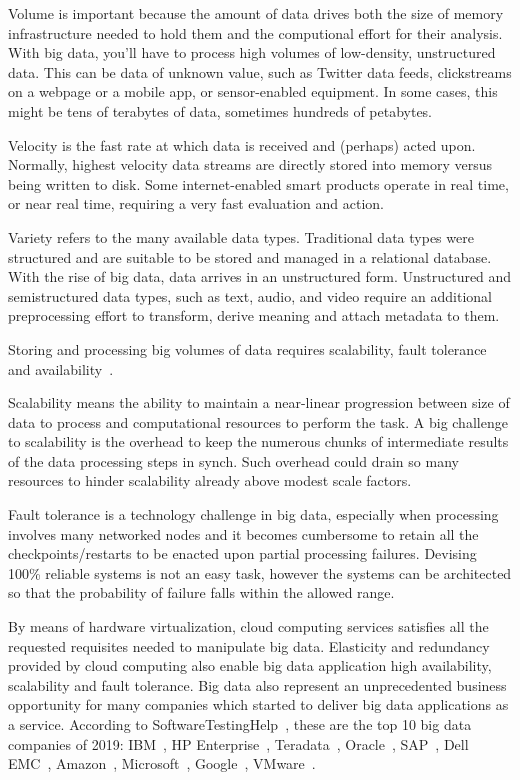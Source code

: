 Volume is important because the amount of data drives both the size of memory infrastructure needed to hold them and the computional effort for their analysis. With big data, you’ll have to process high volumes of low-density, unstructured data. This can be data of unknown value, such as Twitter data feeds, clickstreams on a webpage or a mobile app, or sensor-enabled equipment. In some cases, this might be tens of terabytes of data, sometimes hundreds of petabytes. 

Velocity is the fast rate at which data is received and (perhaps) acted upon. Normally, highest velocity data streams are directly stored into memory versus being written to disk. Some internet-enabled smart products operate in real time, or near real time, requiring a very fast evaluation and action. 

Variety refers to the many available data types. Traditional data types were structured and are suitable to be stored and managed in a relational database. With the rise of big data, data arrives in an unstructured form. Unstructured and semistructured data types, such as text, audio, and video require an additional preprocessing effort to transform, derive meaning and attach metadata to them. 

Storing and processing big volumes of data requires scalability, fault tolerance and availability~\cite{articleBigData:2017}. 

Scalability means the ability to maintain a near-linear progression between size of data to process and computational resources to perform the task. A big challenge to scalability is the overhead to keep the numerous chunks of intermediate results of the data processing steps in synch. Such overhead could drain so many resources to hinder scalability already above modest scale factors.

Fault tolerance is a technology challenge in big data, especially when processing involves many networked nodes and it becomes cumbersome to retain all the checkpoints/restarts to be  enacted upon partial processing failures. Devising 100\% reliable systems is not an easy task, however the systems can be architected so that the probability of failure falls within the allowed range. 

By means of hardware virtualization, cloud computing services satisfies all the requested requisites needed to manipulate big data. Elasticity and redundancy provided by cloud computing also enable big data application high availability, scalability and fault tolerance.
Big data also represent an unprecedented business opportunity for many companies which started to deliver big data applications as a service. According to SoftwareTestingHelp~\cite{misc:BigDataCompanies}, these are the top 10 big data companies of 2019: IBM~\cite{misc:IBM}, HP Enterprise~\cite{misc:HPE}, Teradata~\cite{misc:Teradata}, Oracle~\cite{misc:Oracle}, SAP~\cite{misc:SAP}, Dell EMC~\cite{misc:EMC}, Amazon~\cite{misc:AWS}, Microsoft~\cite{misc:Microsoft}, Google~\cite{misc:Google}, VMware~\cite{misc:VMware}.

